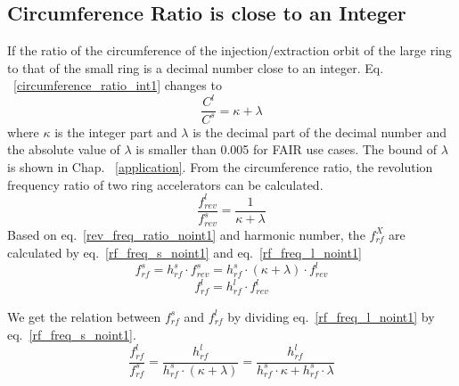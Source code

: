 \subsection{Circumference Ratio is close to an Integer}
\label{sec:cir_close_an_int}
If the ratio of the circumference of the injection/extraction orbit of the large ring to that of the small ring is a decimal number close to an integer. Eq. ~\ref{circumference_ratio_int1} changes to 
\begin{equation}
\frac{C^l}{C^s}= \kappa + \lambda \label{circumference_ratio_noint0}
\end{equation}
where $\kappa$ is the integer part and $\lambda$ is the decimal part of the decimal number and the absolute value of $\lambda$ is smaller than 0.005 for FAIR use cases. The bound of $\lambda$ is shown in Chap. ~\ref{application}. From the circumference ratio, the revolution frequency ratio of two ring accelerators can be calculated.
\begin{equation}
\frac{f_{\mathit{rev}}^{l}}{f_{\mathit{rev}}^{s}}=\frac{1}{ \kappa+ \lambda} \label{rev_freq_ratio_noint1}
\end{equation}
Based on eq.~\ref{rev_freq_ratio_noint1} and harmonic number, the $f_{\mathit{rf}}^{X}$ are calculated by eq.~\ref{rf_freq_s_noint1} and eq.~\ref{rf_freq_l_noint1}
\begin{equation} 
f_{\mathit{rf}}^{s}= h^s_\mathit{rf} \cdot f_{\mathit{rev}}^{s}=h^s_\mathit{rf} \cdot ( \kappa+ \lambda) \cdot f_{\mathit{rev}}^{l} \label{rf_freq_s_noint1}
\end{equation}
\begin{equation} 
f_{\mathit{rf}}^{l}= h^l_\mathit{rf} \cdot f_{\mathit{rev}}^{l} \label{rf_freq_l_noint1}
\end{equation}

We get the relation between $f_{\mathit{rf}}^{s}$ and $f_{\mathit{rf}}^{l}$ by dividing eq.~\ref{rf_freq_l_noint1} by eq.~\ref{rf_freq_s_noint1}.
\begin{equation} 
\frac{f_{\mathit{rf}}^{l}}{f_{\mathit{rf}}^{s}}=\frac{h^l_\mathit{rf}}{h^s_\mathit{rf} \cdot ( \kappa+ \lambda)}=\frac{h^l_\mathit{rf}}{h^s_\mathit{rf} \cdot  \kappa+ h^s_\mathit{rf} \cdot \lambda}\label{close_to_interger_31}
\end{equation}

